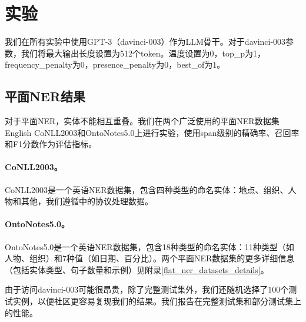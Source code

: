 \documentclass[supercite]{Experimental_Report}
\theoremstyle{definition}
\begin{document}
\section{实验}
\label{experiments}

我们在所有实验中使用GPT-3\cite{brown2020language}（davinci-003）作为LLM骨干。对于davinci-003参数，我们将最大输出长度设置为512个token。温度设置为0，top\_p为1，frequency\_penalty为0，presence\_penalty为0，best\_of为1。

\subsection{平面NER结果}

对于平面NER，实体不能相互重叠。我们在两个广泛使用的平面NER数据集English CoNLL2003和OntoNotes5.0上进行实验，使用span级别的精确率、召回率和F1分数作为评估指标。

\paragraph{CoNLL2003。}CoNLL2003\cite{sang2003introduction}是一个英语NER数据集，包含四种类型的命名实体：地点、组织、人物和其他，我们遵循\cite{li2019unified,ma2016end}中的协议处理数据。

\paragraph{OntoNotes5.0。}OntoNotes5.0\cite{pradhan2013towards}是一个英语NER数据集，包含18种类型的命名实体：11种类型（如人物、组织）和7种值（如日期、百分比）。两个平面NER数据集的更多详细信息（包括实体类型、句子数量和示例）见附录\ref{flat_ner_datasets_details}。

由于访问davinci-003可能很昂贵，除了完整测试集外，我们还随机选择了100个测试实例，以便社区更容易复现我们的结果。我们报告在完整测试集和部分测试集上的性能。
\end{document}
